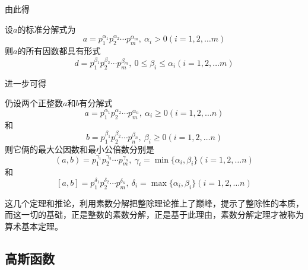 由此得
\begin{inference}
  设$a$的标准分解式为
\[ a = p_1^{\alpha_1}p_2^{\alpha_2} \cdots p_m^{\alpha_m}, \  \alpha_i > 0 (i=1,2,\ldots m) \]
则$a$的所有因数都具有形式
\[ d = p_1^{\beta_1}p_2^{\beta_2} \cdots p_m^{\beta_m}, \  0 \leqslant \beta_i \leqslant \alpha_i (i=1,2,\ldots m) \]
\end{inference}

进一步可得
\begin{theorem}
  仍设两个正整数$a$和$b$有分解式
\[ a = p_1^{\alpha_1}p_2^{\alpha_2} \cdots p_m^{\alpha_n}, \  \alpha_i \geqslant 0 (i=1,2,\ldots n) \]
和
\[ b = p_1^{\beta_1}p_2^{\beta_2} \cdots p_n^{\beta_n}, \  \beta_i \geqslant 0 (i=1,2,\ldots n) \]
则它俩的最大公因数和最小公倍数分别是
\[ (a,b) = p_1^{\gamma_1}p_2^{\gamma_2} \cdots p_m^{\gamma_n}, \  \gamma_i=\min\{\alpha_i,\beta_i\} (i=1,2,\ldots n) \]
和
\[ [a,b] = p_1^{\delta_1}p_2^{\delta_2} \cdots p_m^{\delta_n}, \  \delta_i=\max\{\alpha_i,\beta_i\} (i=1,2,\ldots n) \]
\end{theorem}

这几个定理和推论，利用素数分解把整除理论推上了巅峰，提示了整除性的本质，而这一切的基础，正是整数的素数分解，正是基于此理由，素数分解定理才被称为算术基本定理。

\subsection{高斯函数}
\label{sec:gauss-function}


